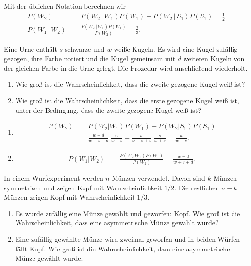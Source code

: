 \solution
Mit der üblichen Notation berechnen wir
\begin{align*}
    P(W_2) &= P( W_2 \,|\, W_1 ) P(W_1) + P(W_2 \,|\, S_1) P(S_1) = \frac{1}{2}\\
    P(W_1 \,|\, W_2 ) &= \frac{ P(W_2 \,|\, W_1 ) P( W_1 )  }{ P(W_2) } = \frac{2}{3}. 
\end{align*}

 Eine Urne
enthält $s$ schwarze und $w$ weiße Kugeln. Es wird eine Kugel zufällig gezogen,
ihre Farbe notiert und die Kugel gemeinsam mit $d$ weiteren Kugeln von der
gleichen Farbe in die Urne gelegt. Die Prozedur wird anschließend wiederholt. 
\begin{enumerate}
    \item Wie groß ist die Wahrscheinlichkeit, dass die zweite gezogene Kugel weiß ist?
    \item Wie groß ist die Wahrscheinlichkeit, dass die erste gezogene Kugel
        weiß ist, unter der Bedingung, dass die zweite gezogene Kugel weiß ist?
\end{enumerate}

\solution
\begin{enumerate}
    \item \begin{align*}
            P(W_2) &= P(W_2 | W_1) P(W_1) + P(W_2 | S_1) P(S_1) \\
            &= \frac{w+d}{w+s+d}\ \frac{w}{w+s} + \frac{w}{w+s+d}\ \frac{s}{w+s} = \frac{w}{w+s}.
        \end{align*}

    \item \begin{align*}
            P(W_1 | W_2 ) &= \frac{ P(W_2 | W_1) P(W_1)  }{ P(W_2) } = \frac{w+d}{w+s+d}.
        \end{align*}
        
\end{enumerate}




In einem Wurfexperiment werden $n$ Münzen verwendet. Davon sind $k$ Münzen
symmetrisch und zeigen Kopf mit Wahrscheinlichkeit $1/2$. Die restlichen $n-k$
Münzen zeigen Kopf mit Wahrscheinlichkeit $1/3$. 
\begin{enumerate}
    \item Es wurde zufällig eine Münze gewählt und geworfen: Kopf. Wie groß ist 
        die Wahrscheinlichkeit, dass eine asymmetrische Münze gewählt wurde?
    \item Eine zufällig gewählte Münze wird zweimal geworfen und in beiden 
        Würfen fällt Kopf. Wie groß ist die Wahrscheinlichkeit, dass eine asymmetrische
        Münze gewählt wurde. 
\end{enumerate}

